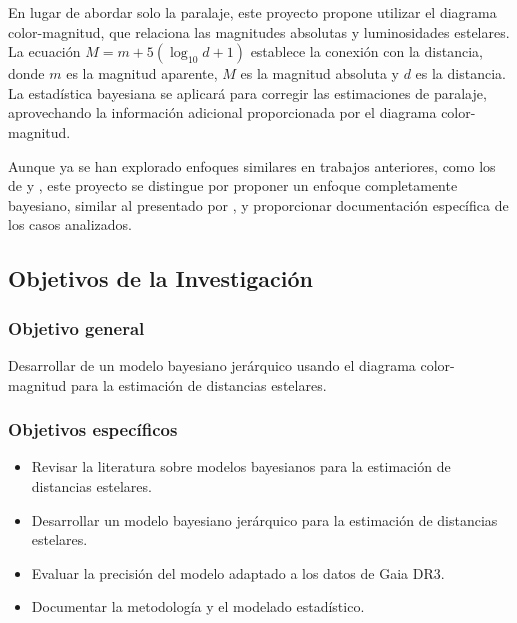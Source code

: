 \documentclass[stu, 12pt, letterpaper, donotrepeattitle, floatsintext, natbib]{apa7_ula}
\begin{document}
En lugar de abordar solo la paralaje, este proyecto propone utilizar
el diagrama color-magnitud, que relaciona las magnitudes absolutas y
luminosidades estelares. La ecuación $\displaystyle M=m+5\left(\log_{10}d+1\right)$
establece la conexión con la distancia, donde $m$ es la magnitud aparente, $M$ es la
magnitud absoluta y $d$ es la distancia. La estadística bayesiana se
aplicará para corregir las estimaciones de paralaje, aprovechando
la información adicional proporcionada por el diagrama color-magnitud.

Aunque ya se han explorado enfoques similares en trabajos anteriores,
como los de \citet{Anderson_2017} y \citet{Zhang_2023},
este proyecto se distingue por proponer un enfoque completamente bayesiano,
similar al presentado por \citet{Leistedt_2017}, y proporcionar documentación
específica de los casos analizados.


\subsection{Objetivos de la Investigación}

\subsubsection{Objetivo general}

Desarrollar de un modelo bayesiano jerárquico usando el
diagrama color-magnitud para la estimación de distancias estelares.

\subsubsection{Objetivos específicos}

\begin{itemize}
    \item Revisar la literatura sobre modelos bayesianos para la estimación de distancias estelares.
    \item Desarrollar un modelo bayesiano jerárquico para la estimación de distancias estelares.
    \item Evaluar la precisión del modelo adaptado a los datos de Gaia DR3.
    \item Documentar la metodología y el modelado estadístico.
\end{itemize}
\end{document}
